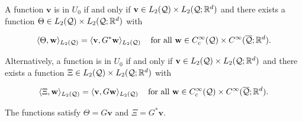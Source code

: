 \begin{lemma}\label{AltU0}
    A function $\mathbf{v}$ is in $U_0$ if and only if $\mathbf{v}\in L_2(\mathcal{Q})\times L_2(\mathcal{Q};\mathbb{R}^d)$ and there exists a function $\Theta \in L_2(\mathcal{Q})\times L_2(\mathcal{Q};\mathbb{R}^d)$ with

    $$\langle \Theta , \mathbf{w} \rangle_{L_2(\mathcal{Q})}=\langle \mathbf{v} , G^*\mathbf{w} \rangle_{L_2(\mathcal{Q})}\hspace{0.3 cm}\text{ for all }\mathbf{w}\in C_c^\infty(\mathcal{Q})\times C^\infty(\overline{\mathcal{Q}};\mathbb{R}^d).$$

    Alternatively, a function is in $U_0$ if and only if $\mathbf{v}\in L_2(\mathcal{Q})\times L_2(\mathcal{Q};\mathbb{R}^d)$ and there exists a function $\Xi \in L_2(\mathcal{Q})\times L_2(\mathcal{Q};\mathbb{R}^d)$ with

    $$\langle \Xi , \mathbf{w} \rangle_{L_2(\mathcal{Q})}=\langle \mathbf{v} , G\mathbf{w} \rangle_{L_2(\mathcal{Q})}\hspace{0.3 cm}\text{ for all }\mathbf{w}\in C_c^\infty(\mathcal{Q})\times C^\infty(\overline{\mathcal{Q}};\mathbb{R}^d).$$

    The functions satisfy $\Theta=G\mathbf{v}$ and $\Xi=G^*\mathbf{v}$.
\end{lemma}

